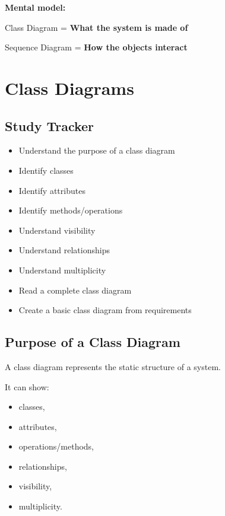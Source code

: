 \documentclass[11pt,a4paper]{article}
\newcommand{\checkitem}{$\square$}
\begin{document}
\begin{conceptbox}
\textbf{Mental model:}

Class Diagram = \textbf{What the system is made of}

Sequence Diagram = \textbf{How the objects interact}
\end{conceptbox}

\section{Class Diagrams}

\subsection{Study Tracker}

\begin{itemize}[label=\checkitem]
    \item Understand the purpose of a class diagram
    \item Identify classes
    \item Identify attributes
    \item Identify methods/operations
    \item Understand visibility
    \item Understand relationships
    \item Understand multiplicity
    \item Read a complete class diagram
    \item Create a basic class diagram from requirements
\end{itemize}

\subsection{Purpose of a Class Diagram}

A class diagram represents the static structure of a system.

It can show:

\begin{itemize}
    \item classes,
    \item attributes,
    \item operations/methods,
    \item relationships,
    \item visibility,
    \item multiplicity.
\end{itemize}
\end{document}
